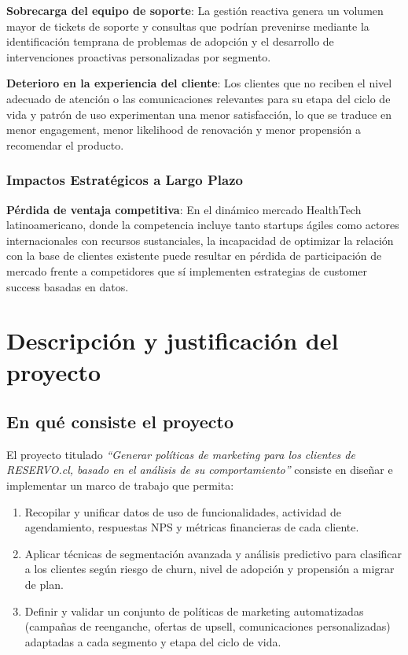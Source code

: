 \textbf{Sobrecarga del equipo de soporte}: La gestión reactiva genera un volumen mayor de tickets de soporte y consultas que podrían prevenirse mediante la identificación temprana de problemas de adopción y el desarrollo de intervenciones proactivas personalizadas por segmento.

\textbf{Deterioro en la experiencia del cliente}: Los clientes que no reciben el nivel adecuado de atención o las comunicaciones relevantes para su etapa del ciclo de vida y patrón de uso experimentan una menor satisfacción, lo que se traduce en menor engagement, menor likelihood de renovación y menor propensión a recomendar el producto.

\subsubsection{Impactos Estratégicos a Largo Plazo}

\textbf{Pérdida de ventaja competitiva}: En el dinámico mercado HealthTech latinoamericano, donde la competencia incluye tanto startups ágiles como actores internacionales con recursos sustanciales, la incapacidad de optimizar la relación con la base de clientes existente puede resultar en pérdida de participación de mercado frente a competidores que sí implementen estrategias de customer success basadas en datos.


\section{Descripción y justificación del proyecto}
\subsection{En qué consiste el proyecto}

El proyecto titulado \emph{“Generar políticas de marketing para los clientes de RESERVO.cl, basado en el análisis de su comportamiento”} consiste en diseñar e implementar un marco de trabajo que permita:
\begin{enumerate}
  \item Recopilar y unificar datos de uso de funcionalidades, actividad de agendamiento, respuestas NPS y métricas financieras de cada cliente.
  \item Aplicar técnicas de segmentación avanzada y análisis predictivo para clasificar a los clientes según riesgo de churn, nivel de adopción y propensión a migrar de plan.
  \item Definir y validar un conjunto de políticas de marketing automatizadas (campañas de reenganche, ofertas de upsell, comunicaciones personalizadas) adaptadas a cada segmento y etapa del ciclo de vida.
\end{enumerate}

